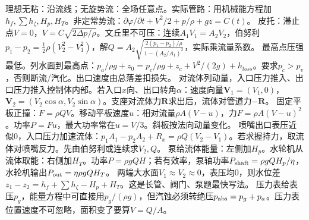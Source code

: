 理想无粘：沿流线；无旋势流：全场任意点。实际管路：用机械能方程加$h_f,\sum h_\zeta,H_p,H_T$。非定常势流：$\partial\varphi/\partial t+V^2/2+p/\rho+gz=C(t)$。
皮托：滞止点$V=0$，$V=C\sqrt{2\Delta p/\rho}$。文丘里不可压：连续$A_1V_1=A_2V_2$，伯努利$p_1-p_2=\frac12\rho(V_2^2-V_1^2)$，解$Q=A_2\sqrt{\frac{2(p_1-p_2)/\rho}{1-(A_2/A_1)^2}}$，实际乘流量系数。
最高点压强最低。列水面到最高点：$p_a/\rho g+z_0=p_c/\rho g+z_c+V^2/(2g)+h_{loss}$。要求$p_c>p_v$，否则断流/汽化。出口速度由总落差扣损失。
对流体列动量，入口压力推入、出口压力推入控制体内部。若入口$x$向、出口转角$\alpha$：速度向量$\bm V_1=(V_1,0)$，$\bm V_2=(V_2\cos\alpha,V_2\sin\alpha)$。支座对流体力$\bm R$求出后，流体对管道力$-\bm R$。
固定平板正撞：$F=\rho QV$。移动平板速度$u$：相对流量$\rho A(V-u)$，力$F=\rho A(V-u)^2$。功率$P=Fu$，最大功率常在$u=V/3$。斜板按法向动量变化。
喷嘴出口表压近似0，入口压力加速流体：$p_1A_1-p_2A_2+R_x=\rho Q(V_2-V_1)$。若求握持力，取流体对喷嘴反力。先由伯努利或连续求$V_2,Q$。
泵给流体能量：左侧加$H_p$。水轮机从流体取能：右侧加$H_T$。功率$P=\rho gQH$；若有效率，泵轴功率$P_{\rm shaft}=\rho gQH_p/\eta$，水轮机输出$P_{\rm out}=\eta\rho gQH_T$。
两端大水面$V_1\approx V_2\approx0$，表压均0，则水位差$z_1-z_2=h_f+\sum h_\zeta-H_p+H_T$。这是长管、阀门、泵题最快写法。
压力表给表压$p_g$，能量方程中可直接用$p_g/(\rho g)$，但汽蚀必须转绝压$p_{\rm abs}=p_g+p_a$。压力表位置速度不可忽略，面积变了要算$V=Q/A$。

